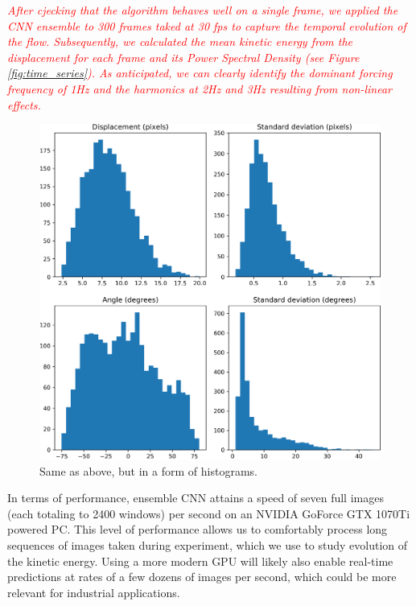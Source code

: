 \documentclass{svjour3}                     %
\newcommand{\new}[1]{\textit{\textcolor{red}{#1}}}
\begin{document}
\new{After cjecking that the algorithm behaves well on a single frame, we applied the CNN ensemble to 300 frames taked at 30 fps to capture the temporal evolution of the flow. Subsequently, we calculated the mean kinetic energy from the displacement for each frame and its Power Spectral Density (see Figure \ref{fig:time_series}). As anticipated, we can clearly identify the dominant forcing frequency of 1Hz and the harmonics at 2Hz and 3Hz resulting from non-linear effects.} 

\begin{figure}
\includegraphics[width=\textwidth]{figs/figure8b.png}
\caption{Same as above, but in a form of histograms.}
\label{fig:fig9b}
\end{figure}

In terms of performance, ensemble CNN attains a speed of seven full images (each totaling to 2400 windows) per second on an NVIDIA GoForce GTX 1070Ti powered PC. This level of performance allows us to comfortably process long sequences of images taken during experiment, which we use to study evolution of the kinetic energy. Using a more modern GPU will likely also enable real-time predictions at rates of a few dozens of images per second, which could be more relevant for industrial applications.
\end{document}
